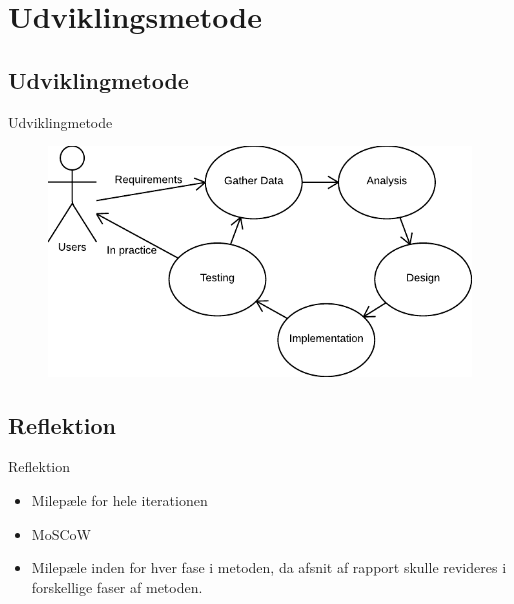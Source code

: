 \section{Udviklingsmetode}

\subsection{Udviklingmetode}
\begin{frame}{Udviklingmetode}
  \begin{figure}
    \centering
    \includegraphics[width=\textwidth]{slides/Heider/Developmentprocess}
  \end{figure}
\end{frame}
\subsection{Reflektion}
\begin{frame}{Reflektion}
  \begin{itemize}
    \item Milepæle for hele iterationen
    \item MoSCoW
    \item Milepæle inden for hver fase i metoden, da afsnit af rapport skulle revideres i forskellige faser af metoden.
  \end{itemize}
\end{frame}
